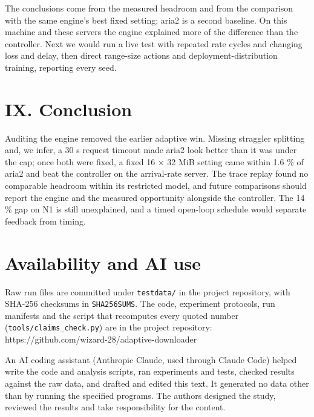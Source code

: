 \documentclass[conference]{IEEEtran}
\begin{document}
The conclusions come from the measured headroom and from the comparison with the same engine's best fixed setting; aria2 is a second baseline. On this machine and these servers the engine explained more of the difference than the controller. Next we would run a live test with repeated rate cycles and changing loss and delay, then direct range-size actions and deployment-distribution training, reporting every seed.


\section*{IX. Conclusion}

Auditing the engine removed the earlier adaptive win. Missing straggler splitting and, we infer, a 30 s request timeout made aria2 look better than it was under the cap; once both were fixed, a fixed 16 × 32 MiB setting came within 1.6 \% of aria2 and beat the controller on the arrival-rate server. The trace replay found no comparable headroom within its restricted model, and future comparisons should report the engine and the measured opportunity alongside the controller. The 14 \% gap on N1 is still unexplained, and a timed open-loop schedule would separate feedback from timing.


\section*{Availability and AI use}

Raw run files are committed under \texttt{testdata/\allowbreak{}} in the project repository, with SHA-256 checksums in \texttt{SHA256SUMS}. The code, experiment protocols, run manifests and the script that recomputes every quoted number (\texttt{tools/\allowbreak{}claims\_check.py}) are in the project repository: https://github.com/wizard-28/adaptive-downloader


An AI coding assistant (Anthropic Claude, used through Claude Code) helped write the code and analysis scripts, ran experiments and tests, checked results against the raw data, and drafted and edited this text. It generated no data other than by running the specified programs. The authors designed the study, reviewed the results and take responsibility for the content.


\footnotesize
\balance


\end{document}
